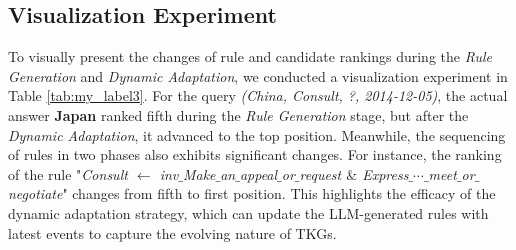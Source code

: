 \documentclass{article}
\begin{document}
\subsection{Visualization Experiment}\label{VE}
To visually present the changes of rule and candidate rankings during the \textit{Rule Generation} and \textit{Dynamic Adaptation}, we conducted a visualization experiment in Table \ref{tab:my_label3}. For the query \textit{(China, Consult, ?, 2014-12-05)}, the actual answer \textbf{Japan} ranked fifth during the \textit{Rule Generation} stage, but after the \textit{Dynamic Adaptation}, it advanced to the top position.
Meanwhile, the sequencing of rules in two phases also exhibits significant changes. For instance, the ranking of the rule "\textit{Consult $\leftarrow$ inv$\_$Make$\_$an$\_$appeal$\_$or$\_$request $\&$ Express$\_$$\cdots$$\_$meet$\_$or$\_$negotiate}" changes from fifth to first position.
This highlights the efficacy of the dynamic adaptation strategy, which can  update the LLM-generated rules with latest events to capture the evolving nature of TKGs.
\end{document}
